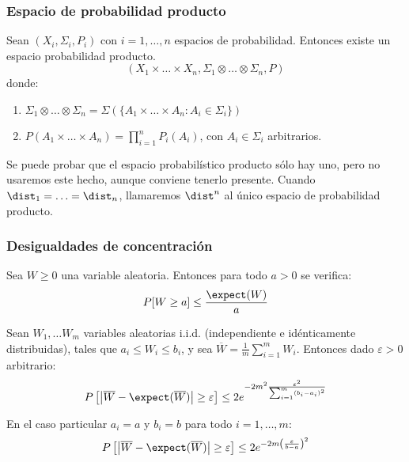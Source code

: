  \begin{frame}\frametitle{Espacio de probabilidad producto}
  \begin{theorem}
   Sean $(X_i, \Sigma_i, P_i)$ con $i=1,\ldots, n$ espacios de probabilidad. Entonces existe un espacio probabilidad
   producto.
   \[(X_1 \times \ldots \times X_n, \Sigma_1 \otimes \ldots \otimes \Sigma_n, P)\]
   donde:
   \begin{enumerate}[i]
   \item $\Sigma_1 \otimes \ldots \otimes \Sigma_n = \Sigma\left(\{A_1 \times \ldots \times A_n: A_i\in \Sigma_i\}\right)$
   \item $P(A_1 \times \ldots \times A_n) = \prod_{i=1}^n P_i(A_i)$, con $A_i\in \Sigma_i$ arbitrarios.
  \end{enumerate}
  \end{theorem}
  
  Se puede probar que el espacio probabilístico producto sólo hay uno, pero no usaremos este hecho, aunque conviene tenerlo
  presente. Cuando $\dist_1 = \ldots = \dist_n$, llamaremos $\dist^n$ al único espacio de probabilidad producto.
 \end{frame}
 
 \begin{frame}\frametitle{Desigualdades de concentración}
 \begin{lemma}
  Sea $W \ge 0$ una variable aleatoria. Entonces para todo $a > 0$ se verifica:
  \[
    P[W \ge a] \le \frac{\expect(W)}{a}
  \]
  \label{ineq:markov}
 \end{lemma}
  
  \begin{lemma}
   Sean $W_1, \ldots W_m$ variables aleatorias i.i.d. (independiente e idénticamente distribuidas), tales que 
   $a_i \le W_i \le b_i$, y sea $\overline{W} = \frac{1}{m} \sum_{i=1}^m W_i$. Entonces dado $\varepsilon > 0$ arbitrario:
   \[
     P\left[\left| \overline{W} - \expect(\overline{W}) \right| \ge \varepsilon \right] \le 2e^{-2m^2 \frac{\varepsilon^2}{\sum_{i=1}^m (b_i-a_i)^2}}
   \]
   
   En el caso particular $a_i = a$ y $b_i = b$ para todo $i=1, \ldots, m$:
   \[
     P\left[\left| \overline{W} - \expect(\overline{W}) \right| \ge \varepsilon \right] \le 2e^{-2m \left(\frac{\varepsilon}{b-a}\right)^2}
   \] 
   \label{ineq:hoeffding}
  \end{lemma}
 \end{frame}